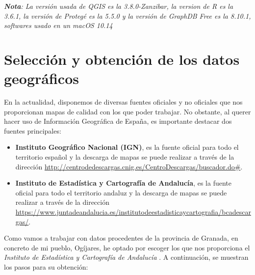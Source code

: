 
\textit{\textbf{Nota}: La versión usada de QGIS es la 3.8.0-Zanzibar, la version de R es la 3.6.1, la versión de Protegé es la 5.5.0 y la versión de GraphDB Free es la 8.10.1, softwares usado en un macOS 10.14}

\section{Selección y obtención de los datos geográficos}
\label{ch:capitulo5-datos}

En la actualidad, disponemos de diversas fuentes oficiales y no oficiales que nos proporcionan mapas de calidad con los que poder trabajar. No obstante, al querer hacer uso de Información Geográfica de España, es importante destacar dos fuentes principales:

\begin{itemize}
	\item \textbf{Instituto Geográfico Nacional (IGN)}, es la fuente oficial para todo el territorio español y la descarga de mapas se puede realizar a través de la dirección \url{http://centrodedescargas.cnig.es/CentroDescargas/buscador.do#}.
	
	\item \textbf{Instituto de Estadística y Cartografía de Andalucía}, es la fuente oficial para todo el territorio andaluz y la descarga de mapas se puede realizar a través de la dirección \url{https://www.juntadeandalucia.es/institutodeestadisticaycartografia/bcadescargas/}.
\end{itemize}
 
Como vamos a trabajar con datos procedentes de la provincia de Granada, en concreto de mi pueblo, Ogíjares, he optado por escoger los que nos proporciona el \textit{Instituto de Estadística y Cartografía de Andalucía} \cite{base-andalucia}. A continuación, se muestran los pasos para su obtención:

